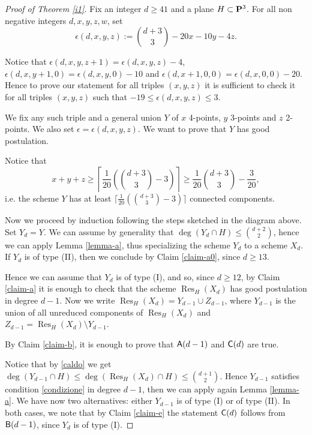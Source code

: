 \documentclass{amsart}
\theoremstyle{plain}
\theoremstyle{definition}
\begin{document}
\begin{proof}[Proof of Theorem \ref{i1}]
Fix an integer $d \ge 41$ and a plane $H \subset {\bf {P}}^3$.
For all non negative integers $d,x,y,z,w$, set
$$\epsilon (d,x,y,z):= \binom{d+3}{3} - 20x-10y-4z.$$

Notice that $\epsilon (d,x,y,z+1) =\epsilon (d,x,y,z) -4$,
$\epsilon (d,x,y+1,0)=\epsilon (d,x,y,0)-10$ and
$\epsilon (d,x+1,0,0) = \epsilon (d,x,0,0)-20$.
Hence to prove our statement for all triples $(x,y,z)$ it
is sufficient to check it for all triples $(x,y,z)$ such
that $-19 \le \epsilon (d,x,y,z) \le 3$.

We fix any such triple and
a general union $Y$ of $x$ 4-points, $y$ 3-points and $z$
2-points. We also set $\epsilon=\epsilon (d,x,y,z)$.
We want to prove that $Y$ has good postulation.

Notice that
\begin{equation}\label{numcomponenti}
x+y+z \ge \left\lceil
  \frac{1}{20}\left(\binom{d+3}{3}-3\right)\right\rceil\ge
\frac{1}{20}\binom{d+3}{3}-\frac{3}{20},
\end{equation}
i.e. the scheme $Y$ has at least
$\lceil \frac{1}{20}(\binom{d+3}{3}-3)\rceil$ connected components.

Now we proceed by induction following the steps sketched in the diagram
above. Set $Y_d=Y$.
We can assume by generality that $\deg(Y_d\cap H)\le\binom{d+2}{2}$,
hence we can apply Lemma \ref{lemma-a}, thus specializing the scheme $Y_d$ to a scheme $X_d$.
If $Y_d$ is of type (II), then we conclude by Claim \ref{claim-a0},
since $d\ge 13$.

Hence  we can assume that $Y_d$ is of type (I), and so, since $d\ge
12$, by Claim \ref{claim-a} it is enough to check that the scheme
$\operatorname{Res}_H(X_d)$ has good postulation in degree $d-1$.
Now we write $\operatorname{Res}_H(X_d)=Y_{d-1}\cup Z_{d-1}$,
where $Y_{d-1}$ is the union of all unreduced components of
$\operatorname{Res}_H(X_d)$ and $Z_{d-1}=\operatorname{Res}_H(X_d)\setminus Y_{d-1}$.

By Claim \ref{claim-b}, it is enough to prove that
${\sf{{A}}}(d-1)$ and ${\sf{C}}(d)$ are true.

Notice that by \eqref{caldo} we get
$\deg(Y_{d-1}\cap H)\leq \deg(\operatorname{Res}_H(X_d)\cap H)\le \binom{d+1}{2}$.
Hence $Y_{d-1}$ satisfies condition \eqref{condizione} in degree $d-1$, then
we can apply again Lemma \ref{lemma-a}.
We have now two alternatives: either $Y_{d-1}$ is of type (I) or of
type (II).
In both cases, we note that by Claim \ref{claim-e} the statement ${\sf{C}}(d)$
follows from ${\sf{B}}(d-1)$, since $Y_d$ is of type (I).


\end{proof}
\end{document}
